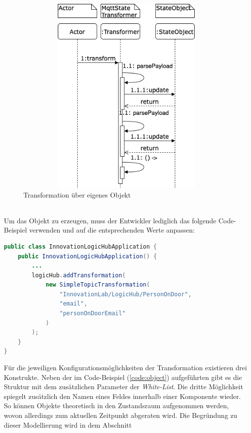     \begin{figure}[hbt!]
        \centering
        \includegraphics[width=14cm,height=10cm,keepaspectratio]{images/Transformation_new.drawio.png}
        \caption{Transformation über eigenes Objekt}
        \label{fig:sequenceTransformationNew}
    \end{figure}
    \\
    Um das Objekt zu erzeugen, muss der Entwickler lediglich das folgende Code-Beispiel verwenden und auf die entsprechenden Werte anpassen:
\begin{lstlisting}[language=Java, frame=lines, xleftmargin=\parindent, style=algoBericht, label={code:object}, captionpos=b, caption={Transformation über ein eigenes Objekt}]
public class InnovationLogicHubApplication {
    public InnovationLogicHubApplication() {
        ... 
        logicHub.addTransformation(
            new SimpleTopicTransformation(
                "InnovationLab/LogicHub/PersonOnDoor",
                "email",
                "personOnDoorEmail"
            )
        );
    }
}
\end{lstlisting}
    Für die jeweiligen Konfigurationsmöglichkeiten der Transformation existieren drei Konstrukte. 
    Neben der im Code-Beispiel (\ref{code:object}) aufgeführten gibt es die Struktur mit dem zusätzlichen Parameter der \textit{White-List}. 
    Die dritte Möglichkeit spiegelt zusätzlich den Namen eines Feldes innerhalb einer Komponente wieder. So können Objekte theoretisch in den Zustandsraum 
    aufgenommen werden, wovon allerdings zum aktuellen Zeitpunkt abgeraten wird. Die Begründung zu dieser Modellierung wird in dem Abschnitt 
